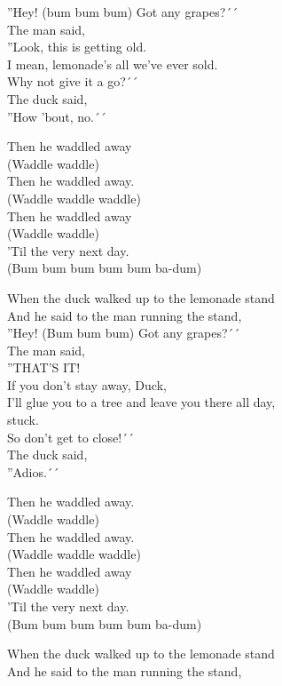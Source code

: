 ''Hey! (bum bum bum) Got any grapes?´´\\
The man said,\\
''Look, this is getting old.\\
I mean, lemonade's all we've ever sold.\\
Why not give it a go?´´\\
The duck said,\\
''How 'bout, no.´´\par
\vspace{10pt}
Then he waddled away\\
(Waddle waddle)\\
Then he waddled away.\\
(Waddle waddle waddle)\\
Then he waddled away\\
(Waddle waddle)\\
'Til the very next day.\\
(Bum bum bum bum bum ba-dum)\par
\vspace{10pt}
When the duck walked up to the lemonade stand\\
And he said to the man running the stand,\\
''Hey! (Bum bum bum) Got any grapes?´´\\
The man said,\\
''THAT’S IT!\\
If you don't stay away, Duck,\\
I'll glue you to a tree and leave you there all day,\\
stuck.\\
So don't get to close!´´\\
The duck said,\\
''Adios.´´\par
\vspace{10pt}
Then he waddled away.\\
(Waddle waddle)\\
Then he waddled away.\\
(Waddle waddle waddle)\\
Then he waddled away\\
(Waddle waddle)\\
'Til the very next day.\\
(Bum bum bum bum bum ba-dum)\par
\vspace{10pt}
When the duck walked up to the lemonade stand\\
And he said to the man running the stand,\\
